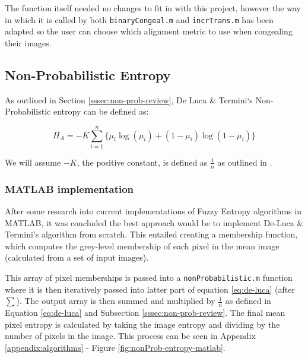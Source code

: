 The function itself needed no changes to fit in with this project, however the way in which it is called by both \texttt{binaryCongeal.m} and \texttt{incrTrans.m} has been adapted so the user can choose which alignment metric to use when congealing their images.

\newpage
\subsection{Non-Probabilistic Entropy}
\label{ssec:non-prob-sec}

As outlined in Section \ref{sssec:non-prob-review}, De Luca \& Termini`s Non-Probabilistic entropy can be defined as:

\begin{equation}
  \label{eq:de-luca}
  H_A = -K \displaystyle\sum_{i=1}^{n}{\{\mu_i\log(\mu_i) + (1 - \mu_i)\log(1 - \mu_i)\}}
\end{equation}


We will assume $-K$, the positive constant, is defined as $\frac{1}{n}$ as outlined in \cite{DeLuca_Termini_1972}.

\subsubsection{MATLAB implementation}

After some research into current implementations of Fuzzy Entropy algorithms in MATLAB, it was concluded the best approach would be to implement De-Luca \& Termini's algorithm from scratch. This entailed creating a membership function, which computes the grey-level membership of each pixel in the mean image (calculated from a set of input images).

This array of pixel memberships is passed into a \texttt{nonProbabilistic.m} function where it is then iteratively passed into latter part of equation \ref{eq:de-luca} \big(after $\displaystyle\sum$\big). The output array is then summed and multiplied by $\frac{1}{n}$ as defined in Equation \ref{eq:de-luca} and Subsection \ref{sssec:non-prob-review}. The final mean pixel entropy is calculated by taking the image entropy and dividing by the number of pixels in the image. This process can be seen in Appendix \ref{appendix:algorithms} - Figure \ref{fig:nonProb-entropy-matlab}.

